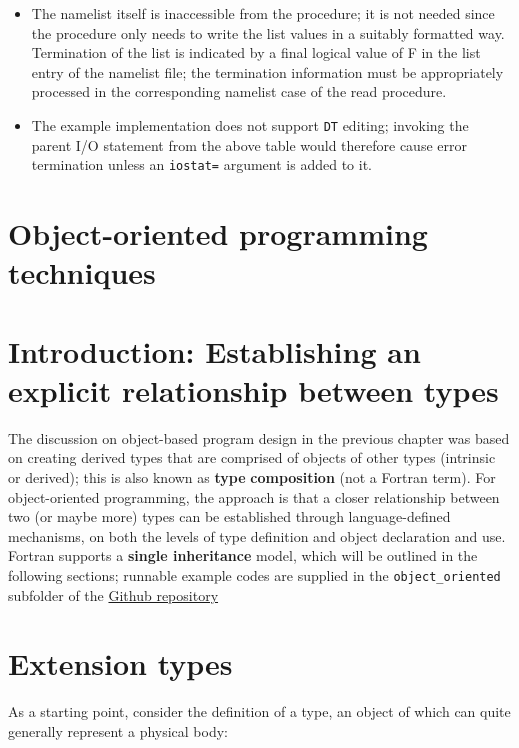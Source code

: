 \documentclass[
]{scrartcl}
\providecommand{\tightlist}{%
  \setlength{\itemsep}{0pt}\setlength{\parskip}{0pt}}
\begin{document}
\begin{itemize}
\tightlist
\item
  The namelist itself is inaccessible from the procedure; it is not
  needed since the procedure only needs to write the list values in a
  suitably formatted way. Termination of the list is indicated by a
  final logical value of \textquotesingle F\textquotesingle{} in the
  list entry of the namelist file; the termination information must be
  appropriately processed in the corresponding namelist case of the read
  procedure.
\item
  The example implementation does not support \texttt{DT} editing;
  invoking the parent I/O statement from the above table would therefore
  cause error termination unless an \texttt{iostat=} argument is added
  to it.
\end{itemize}

\section{Object-oriented programming
techniques}\label{object-oriented-programming-techniques}

\section{Introduction: Establishing an explicit relationship between
types}\label{introduction-establishing-an-explicit-relationship-between-types}

The discussion on object-based program design in the previous chapter
was based on creating derived types that are comprised of objects of
other types (intrinsic or derived); this is also known as \textbf{type}
\textbf{composition} (not a Fortran term). For object-oriented
programming, the approach is that a closer relationship between two (or
maybe more) types can be established through language-defined
mechanisms, on both the levels of type definition and object declaration
and use. Fortran supports a \textbf{single inheritance} model, which
will be outlined in the following sections; runnable example codes are
supplied in the \texttt{object\_oriented} subfolder of the
\href{https://github.com/reinh-bader/object_fortran}{Github repository}

\section{Extension types}\label{extension-types}

As a starting point, consider the definition of a type, an object of
which can quite generally represent a physical body:
\end{document}
